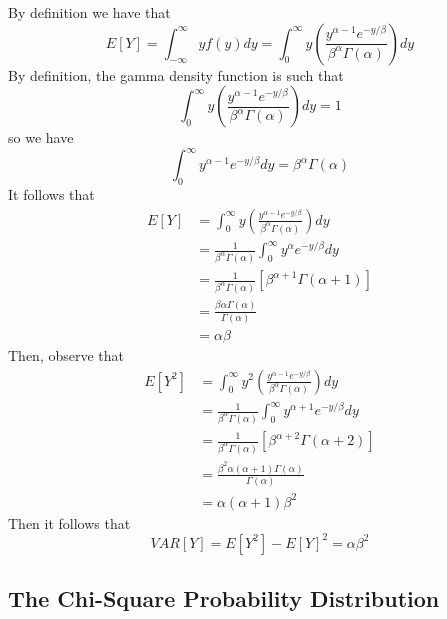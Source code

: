 \documentclass[12pt, a4paper, twoside, openright, titlepage]{book}
\begin{document}
\begin{proof*}{}{}
    By definition we have that \begin{equation*}
        E[Y] = \int_{-\infty}^{\infty}yf(y)dy = \int_0^{\infty}y\left(\frac{y^{\alpha - 1}e^{-y/\beta}}{\beta^{\alpha}\Gamma(\alpha)}\right)dy
    \end{equation*}
    By definition, the gamma density function is such that \begin{equation*}
        \int_0^{\infty}y\left(\frac{y^{\alpha - 1}e^{-y/\beta}}{\beta^{\alpha}\Gamma(\alpha)}\right)dy = 1
    \end{equation*}
    so we have \begin{equation*}
        \int_0^{\infty}y^{\alpha -1}e^{-y/\beta}dy = \beta^{\alpha}\Gamma(\alpha)
    \end{equation*}
    It follows that \begin{align*}
        E[Y] &=  \int_0^{\infty}y\left(\frac{y^{\alpha - 1}e^{-y/\beta}}{\beta^{\alpha}\Gamma(\alpha)}\right)dy \\
        &= \frac{1}{\beta^{\alpha}\Gamma(\alpha)}\int_0^{\infty}y^{\alpha}e^{-y/\beta}dy \\
        &= \frac{1}{\beta^{\alpha}\Gamma(\alpha)}\left[\beta^{\alpha+1}\Gamma(\alpha+1)\right] \\
        &= \frac{\beta\alpha\Gamma(\alpha)}{\Gamma(\alpha)} \\
        &= \alpha\beta
    \end{align*}
    Then, observe that \begin{align*}
        E[Y^2] &= \int_0^{\infty}y^2\left(\frac{y^{\alpha - 1}e^{-y/\beta}}{\beta^{\alpha}\Gamma(\alpha)}\right)dy \\
        &= \frac{1}{\beta^{\alpha}\Gamma(\alpha)}\int_0^{\infty}y^{\alpha+1}e^{-y/\beta}dy \\
        &= \frac{1}{\beta^{\alpha}\Gamma(\alpha)}\left[\beta^{\alpha+2}\Gamma(\alpha+2)\right] \\
        &= \frac{\beta^2\alpha(\alpha+1)\Gamma(\alpha)}{\Gamma(\alpha)} \\
        &= \alpha(\alpha+1)\beta^2
    \end{align*}
    Then it follows that \begin{equation*}
        VAR[Y] = E[Y^2]-E[Y]^2 = \alpha\beta^2
    \end{equation*}
\end{proof*}


\subsection{The Chi-Square Probability Distribution}
\end{document}
